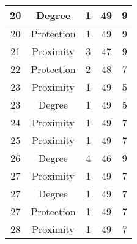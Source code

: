 \documentclass[results.tex]{subfiles}
\begin{document}
\begin{center}
\begin{tabular}{| c || c | c | c | c |}
            \hline
            20                      & Degree                       & 1                      & 49                      & 9                    \\
            \hline
            20                      & Protection                   & 1                      & 49                      & 9                    \\
            \hline
            21                      & Proximity                    & 3                      & 47                      & 9                    \\
            \hline
            22                      & Protection                   & 2                      & 48                      & 7                    \\
            \hline
            23                      & Proximity                    & 1                      & 49                      & 5                    \\
            \hline
            23                      & Degree                       & 1                      & 49                      & 5                    \\
            \hline
            24                      & Proximity                    & 1                      & 49                      & 7                    \\
            \hline
            25                      & Proximity                    & 1                      & 49                      & 7                    \\
            \hline
            26                      & Degree                       & 4                      & 46                      & 9                    \\
            \hline
            27                      & Proximity                    & 1                      & 49                      & 7                    \\
            \hline
            27                      & Degree                       & 1                      & 49                      & 7                    \\
            \hline
            27                      & Protection                   & 1                      & 49                      & 7                    \\
            \hline
            28                      & Proximity                    & 1                      & 49                      & 7                    \\

\end{tabular}
\end{center}
\end{document}
